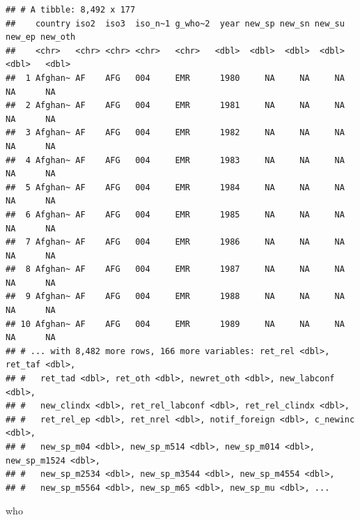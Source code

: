 \documentclass[
]{article}
\newenvironment{Shaded}{\begin{snugshade}}{\end{snugshade}}
\newcommand{\NormalTok}[1]{#1}
\begin{document}
\begin{verbatim}
## # A tibble: 8,492 x 177
##    country iso2  iso3  iso_n~1 g_who~2  year new_sp new_sn new_su new_ep new_oth
##    <chr>   <chr> <chr> <chr>   <chr>   <dbl>  <dbl>  <dbl>  <dbl>  <dbl>   <dbl>
##  1 Afghan~ AF    AFG   004     EMR      1980     NA     NA     NA     NA      NA
##  2 Afghan~ AF    AFG   004     EMR      1981     NA     NA     NA     NA      NA
##  3 Afghan~ AF    AFG   004     EMR      1982     NA     NA     NA     NA      NA
##  4 Afghan~ AF    AFG   004     EMR      1983     NA     NA     NA     NA      NA
##  5 Afghan~ AF    AFG   004     EMR      1984     NA     NA     NA     NA      NA
##  6 Afghan~ AF    AFG   004     EMR      1985     NA     NA     NA     NA      NA
##  7 Afghan~ AF    AFG   004     EMR      1986     NA     NA     NA     NA      NA
##  8 Afghan~ AF    AFG   004     EMR      1987     NA     NA     NA     NA      NA
##  9 Afghan~ AF    AFG   004     EMR      1988     NA     NA     NA     NA      NA
## 10 Afghan~ AF    AFG   004     EMR      1989     NA     NA     NA     NA      NA
## # ... with 8,482 more rows, 166 more variables: ret_rel <dbl>, ret_taf <dbl>,
## #   ret_tad <dbl>, ret_oth <dbl>, newret_oth <dbl>, new_labconf <dbl>,
## #   new_clindx <dbl>, ret_rel_labconf <dbl>, ret_rel_clindx <dbl>,
## #   ret_rel_ep <dbl>, ret_nrel <dbl>, notif_foreign <dbl>, c_newinc <dbl>,
## #   new_sp_m04 <dbl>, new_sp_m514 <dbl>, new_sp_m014 <dbl>, new_sp_m1524 <dbl>,
## #   new_sp_m2534 <dbl>, new_sp_m3544 <dbl>, new_sp_m4554 <dbl>,
## #   new_sp_m5564 <dbl>, new_sp_m65 <dbl>, new_sp_mu <dbl>, ...
\end{verbatim}

\begin{Shaded}
\begin{Highlighting}[]
\NormalTok{who}
\end{Highlighting}
\end{Shaded}
\end{document}
